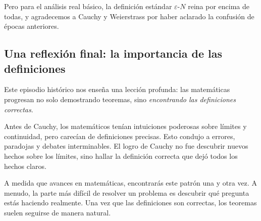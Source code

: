 Pero para el análisis real básico, la definición estándar $\varepsilon$-$N$ reina por encima de todas, y agradecemos a Cauchy y Weierstrass por haber aclarado la confusión de épocas anteriores.

\subsection{Una reflexión final: la importancia de las definiciones}

Este episodio histórico nos enseña una lección profunda: las matemáticas progresan no solo demostrando teoremas, sino \emph{encontrando las definiciones correctas}.

Antes de Cauchy, los matemáticos tenían intuiciones poderosas sobre límites y continuidad, pero carecían de definiciones precisas. Esto condujo a errores, paradojas y debates interminables. El logro de Cauchy no fue descubrir nuevos hechos sobre los límites, sino hallar la definición correcta que dejó todos los hechos claros.

A medida que avances en matemáticas, encontrarás este patrón una y otra vez. A menudo, la parte más difícil de resolver un problema es descubrir qué pregunta estás haciendo realmente. Una vez que las definiciones son correctas, los teoremas suelen seguirse de manera natural.

